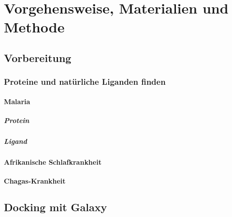 \documentclass[10pt]{article}
\begin{document}
{    \section{Vorgehensweise, Materialien und Methode}\label{sec:vorgehensweise-materialien-und-methode}

    \subsection{Vorbereitung}\label{subsec:vorbereitung}


    \subsubsection{Proteine und natürliche Liganden finden}

    \paragraph{Malaria}

    \subparagraph{Protein}

    \subparagraph{Ligand}

    \paragraph{Afrikanische Schlafkrankheit}

    \paragraph{Chagas-Krankheit}

    \subsection{Docking mit Galaxy}\label{subsec:galaxy}

%
%
%

}
\end{document}
